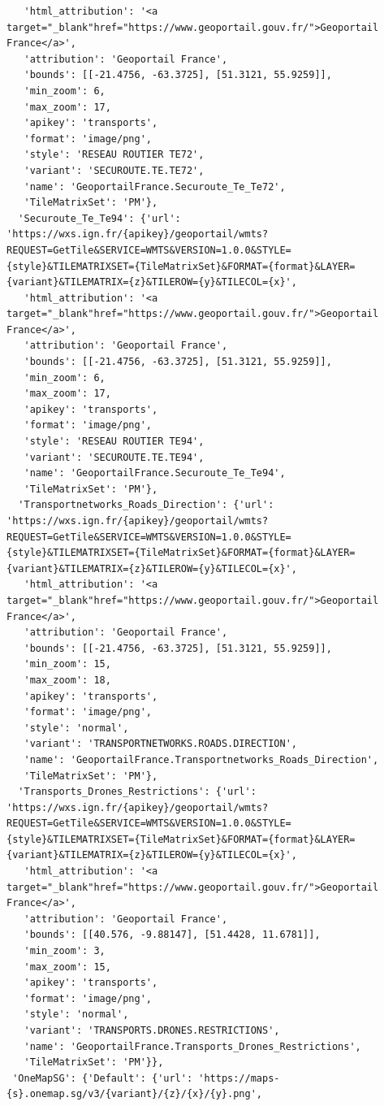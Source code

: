 \documentclass[
  letterpaper,
  DIV=11,
  numbers=noendperiod]{scrreprt}
\begin{document}
\begin{verbatim}
   'html_attribution': '<a target="_blank"href="https://www.geoportail.gouv.fr/">Geoportail France</a>',
   'attribution': 'Geoportail France',
   'bounds': [[-21.4756, -63.3725], [51.3121, 55.9259]],
   'min_zoom': 6,
   'max_zoom': 17,
   'apikey': 'transports',
   'format': 'image/png',
   'style': 'RESEAU ROUTIER TE72',
   'variant': 'SECUROUTE.TE.TE72',
   'name': 'GeoportailFrance.Securoute_Te_Te72',
   'TileMatrixSet': 'PM'},
  'Securoute_Te_Te94': {'url': 'https://wxs.ign.fr/{apikey}/geoportail/wmts?REQUEST=GetTile&SERVICE=WMTS&VERSION=1.0.0&STYLE={style}&TILEMATRIXSET={TileMatrixSet}&FORMAT={format}&LAYER={variant}&TILEMATRIX={z}&TILEROW={y}&TILECOL={x}',
   'html_attribution': '<a target="_blank"href="https://www.geoportail.gouv.fr/">Geoportail France</a>',
   'attribution': 'Geoportail France',
   'bounds': [[-21.4756, -63.3725], [51.3121, 55.9259]],
   'min_zoom': 6,
   'max_zoom': 17,
   'apikey': 'transports',
   'format': 'image/png',
   'style': 'RESEAU ROUTIER TE94',
   'variant': 'SECUROUTE.TE.TE94',
   'name': 'GeoportailFrance.Securoute_Te_Te94',
   'TileMatrixSet': 'PM'},
  'Transportnetworks_Roads_Direction': {'url': 'https://wxs.ign.fr/{apikey}/geoportail/wmts?REQUEST=GetTile&SERVICE=WMTS&VERSION=1.0.0&STYLE={style}&TILEMATRIXSET={TileMatrixSet}&FORMAT={format}&LAYER={variant}&TILEMATRIX={z}&TILEROW={y}&TILECOL={x}',
   'html_attribution': '<a target="_blank"href="https://www.geoportail.gouv.fr/">Geoportail France</a>',
   'attribution': 'Geoportail France',
   'bounds': [[-21.4756, -63.3725], [51.3121, 55.9259]],
   'min_zoom': 15,
   'max_zoom': 18,
   'apikey': 'transports',
   'format': 'image/png',
   'style': 'normal',
   'variant': 'TRANSPORTNETWORKS.ROADS.DIRECTION',
   'name': 'GeoportailFrance.Transportnetworks_Roads_Direction',
   'TileMatrixSet': 'PM'},
  'Transports_Drones_Restrictions': {'url': 'https://wxs.ign.fr/{apikey}/geoportail/wmts?REQUEST=GetTile&SERVICE=WMTS&VERSION=1.0.0&STYLE={style}&TILEMATRIXSET={TileMatrixSet}&FORMAT={format}&LAYER={variant}&TILEMATRIX={z}&TILEROW={y}&TILECOL={x}',
   'html_attribution': '<a target="_blank"href="https://www.geoportail.gouv.fr/">Geoportail France</a>',
   'attribution': 'Geoportail France',
   'bounds': [[40.576, -9.88147], [51.4428, 11.6781]],
   'min_zoom': 3,
   'max_zoom': 15,
   'apikey': 'transports',
   'format': 'image/png',
   'style': 'normal',
   'variant': 'TRANSPORTS.DRONES.RESTRICTIONS',
   'name': 'GeoportailFrance.Transports_Drones_Restrictions',
   'TileMatrixSet': 'PM'}},
 'OneMapSG': {'Default': {'url': 'https://maps-{s}.onemap.sg/v3/{variant}/{z}/{x}/{y}.png',

\end{verbatim}
\end{document}
